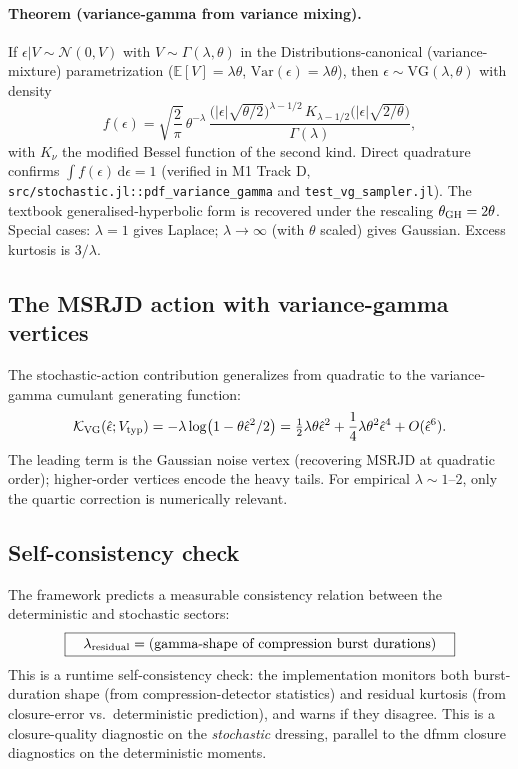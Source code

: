 \documentclass[11pt]{article}
\newcommand{\dd}{\mathrm{d}}
\newcommand{\half}{\tfrac{1}{2}}
\begin{document}
\paragraph{Theorem (variance-gamma from variance mixing).} If
$\epsilon | V \sim \mathcal{N}(0,V)$ with $V\sim\Gamma(\lambda,\theta)$
in the Distributions-canonical (variance-mixture) parametrization
($\mathbb{E}[V]=\lambda\theta$, $\mathrm{Var}(\epsilon)=\lambda\theta$),
then $\epsilon\sim\mathrm{VG}(\lambda,\theta)$ with density
\begin{equation}
  f(\epsilon) = \sqrt{\frac{2}{\pi}}\,\theta^{-\lambda}\,
  \frac{\bigl(|\epsilon|\sqrt{\theta/2}\bigr)^{\lambda-1/2}\,
  K_{\lambda-1/2}\bigl(|\epsilon|\sqrt{2/\theta}\bigr)}{\Gamma(\lambda)},
  \label{eq:VG}
\end{equation}
with $K_\nu$ the modified Bessel function of the second kind. Direct
quadrature confirms $\int f(\epsilon)\,\dd\epsilon = 1$ (verified in
M1 Track D, \verb|src/stochastic.jl::pdf_variance_gamma| and
\verb|test_vg_sampler.jl|). The textbook generalised-hyperbolic
form is recovered under the rescaling $\theta_{\rm GH} = 2\theta$.
Special cases: $\lambda=1$ gives Laplace; $\lambda\to\infty$ (with
$\theta$ scaled) gives Gaussian. Excess kurtosis is $3/\lambda$.

\subsection{The MSRJD action with variance-gamma vertices}

The stochastic-action contribution generalizes from quadratic to the
variance-gamma cumulant generating function:
\begin{equation}
  \mathcal{K}_{\rm VG}(\hat\epsilon; V_{\rm typ})
  = -\lambda\log\bigl(1 - \theta\hat\epsilon^2/2\bigr)
  = \half\lambda\theta\hat\epsilon^2 + \frac{1}{4}\lambda\theta^2\hat\epsilon^4
  + O(\hat\epsilon^6).
  \label{eq:K-VG}
\end{equation}
The leading term is the Gaussian noise vertex (recovering MSRJD at
quadratic order); higher-order vertices encode the heavy tails. For
empirical $\lambda\sim 1$--$2$, only the quartic correction is
numerically relevant.

\subsection{Self-consistency check}

The framework predicts a measurable consistency relation between the
deterministic and stochastic sectors:
\begin{equation}
  \boxed{\quad\lambda_{\rm residual} = (\text{gamma-shape of compression burst durations})\quad}
  \label{eq:self-consistency}
\end{equation}
This is a runtime self-consistency check: the implementation monitors
both burst-duration shape (from compression-detector statistics) and
residual kurtosis (from closure-error vs.\ deterministic prediction),
and warns if they disagree. This is a closure-quality diagnostic on
the \emph{stochastic} dressing, parallel to the dfmm closure
diagnostics on the deterministic moments.
\end{document}
